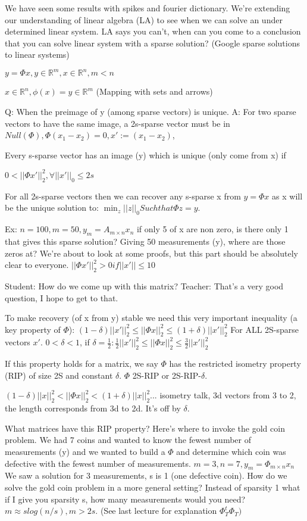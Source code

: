 \documentclass[12pt,letterpaper]{report}
\begin{document}
We have seen some results with spikes and fourier dictionary.  We're extending our understanding of linear algebra (LA) to see when we can solve an under determined linear system.  LA says you can't, when can you come to a conclusion that you can solve linear system with a sparse solution?  (Google sparse solutions to linear systems)

$y = \Phi x, y \in \mathbb{R}^m, x \in \mathbb{R}^n, m < n$

$x \in \mathbb{R}^n, \phi(x) = y \in \mathbb{R}^m$  (Mapping with sets and arrows)

Q: When the preimage of y (among sparse vectors) is unique.  A: For two sparse vectors to have the same image, a 2s-sparse vector must be in $Null(\Phi), \Phi(x_1 - x_2) = 0, x' := (x_1 - x_2)$,

Every s-sparse vector has an image (y) which is unique (only come from x) if

$0 < ||\Phi x' ||_2^2, \forall ||x'||_0 \leq 2s$

For all 2s-sparse vectors then we can recover any s-sparse x from $y = \Phi x$ as x will be the unique solution to: $\min_z||z||_0 Such that \Phi z = y$.

Ex: $n = 100, m = 50,  y_m = A_{m \times n} x_n$ if only 5 of x are non zero, is there only 1 that gives this sparse solution?  Giving 50 measurements (y), where are those zeros at?  We're about to look at some proofs, but this part should be absolutely clear to everyone.  $|| \Phi x' ||_2^2 > 0 if ||x'|| \leq 10$

Student: How do we come up with this matrix?  Teacher: That's a very good question, I hope to get to that.

To make recovery (of x from y) stable we need this very important inequality (a key property of $\Phi$): $(1 - \delta) ||x'||_2^2 \leq ||\Phi x||_2^2 \leq (1 + \delta) ||x'||_2^2$ For ALL 2S-sparse vectors $x'$.  $0 < \delta < 1$, if $\delta = \frac{1}{2}: \frac{1}{2}||x'||_2^2 \leq ||\Phi x||_2^2 \leq \frac{3}{2}||x'||_2^2$

If this property holds for a  matrix, we say $\Phi$ has the restricted isometry property (RIP) of size 2S and constant $\delta$. $\Phi$ 2S-RIP or 2S-RIP-$\delta$.

$(1-\delta)||x||_2^2 < ||\Phi x||_2^2 < (1+\delta)||x||_2^2$... isometry talk, 3d vectors from 3 to 2, the length corresponds from 3d to 2d.  It's off by $\delta$.

What matrices have this RIP property?  Here's where to invoke the gold coin problem.  We had 7 coins and wanted to know the fewest number of measurements (y) and we wanted to build a $\Phi$ and determine which coin was defective with the fewest number of measurements.  $m=3, n=7, y_m = \Phi_{m \times n} x_n$ We saw a solution for 3 measurements, s is 1 (one defective coin). How do we solve the gold coin problem in a more general setting?  Instead of sparsity 1 what if I give you sparsity s, how many measurements would you need? $m \approx s log(n/s), m > 2s$.  (See last lecture for explanation $\Phi_T^t \Phi_T)$
\end{document}
